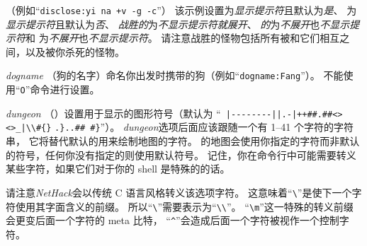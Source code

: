 \documentclass[a4paper, 10pt]{article}
\newcommand{\ib}[1]{\it #1 \hfill}
\begin{document}
（例如“{\tt disclose:yi na +v -g -c}”）
该示例设置{\it \zhTransInventory\/}为{\it 显示提示符\/}且默认为{\it 是\/}、
{\it \zhTransAttributes\/}为{\it 显示提示符\/}且默认为{\it 否\/}、
{\it 战胜的\/}为{\it 不显示提示符就展开\/}、
{\it \zhTransGenocide\/的}为{\it 不展开\/}也{\it 不显示提示符\/}和
{\it \zhTransConduct\/}为{\it 不展开\/}也{\it 不显示提示符\/}。
请注意战胜的怪物包括所有被\zhTransTraps{}和它们相互之间，以及被你杀死的怪物。
\item[\ib{dogname}]
（狗的名字）命名你出发时携带的狗（例如“{\tt dogname:Fang}”）。
不能使用“{\tt O}”命令进行设置。
\item[\ib{dungeon}]
（\zhTransDungeon{}）设置用于显示\zhTransDungeon{}的图形符号（默认为
“\verb& |--------||.-|++##.##<><>_|\\#{}& \verb&.}..## #}&”）。
{\it dungeon\/}选项后面应该跟随一个有 1--41 个字符的字符串，
它将替代默认的用来绘制地图的字符。
\zhTransDungeon{}的地图会使用你指定的字符而非默认的符号，任何你没有指定的则使用默认符号。
记住，你在命令行中可能需要转义某些字符，如果它们对于你的 shell 是特殊的的话。

请注意{\it NetHack\/}会以传统 C 语言风格转义该选项字符。
这意味着“\verb+\+”是使下一个字符使用其字面含义的前缀。
所以“\verb+\+”需要表示为“\verb+\\+”。
“\verb+\m+”这一特殊的转义前缀会更变后面一个字符的 meta 比特，
“{\tt \^{}}”会造成后面一个字符被视作一个控制字符。
\end{document}
